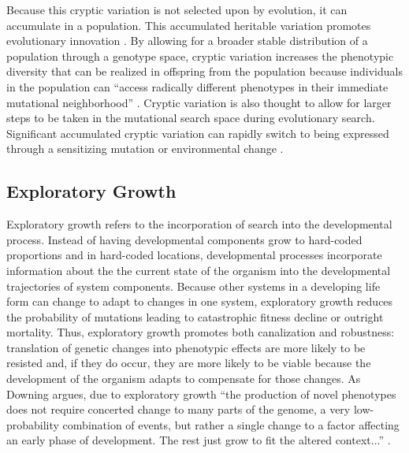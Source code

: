 Because this cryptic variation is not selected upon by evolution, it can accumulate in a population. This accumulated heritable variation promotes evolutionary innovation \cite{Wilder2015ReconcilingEvolvability}. By allowing for a broader stable distribution of a population through a genotype space, cryptic variation increases the phenotypic diversity that can be realized in offspring from the population because individuals in the population can ``access radically different phenotypes in their immediate mutational neighborhood'' \cite{Wilder2015ReconcilingEvolvability}. Cryptic variation is also thought to allow for larger steps to be taken in the mutational search space during evolutionary search. Significant accumulated cryptic variation can rapidly switch to being expressed through a sensitizing mutation or environmental change \cite{Moczek2011TheInnovation}.
        
\subsection{Exploratory Growth}
Exploratory growth refers to the incorporation of search into the developmental process. Instead of having developmental components grow to hard-coded proportions and in hard-coded locations, developmental processes incorporate information about the the current state of the organism into the developmental trajectories of system components. Because other systems in a developing life form can change to adapt to changes in one system, exploratory growth reduces the probability of mutations leading to catastrophic fitness decline or outright mortality. Thus, exploratory growth promotes both canalization and robustness: translation of genetic changes into phenotypic effects are more likely to be resisted and, if they do occur, they are more likely to be viable because the development of the organism adapts to compensate for those changes. As Downing argues, due to exploratory growth ``the production of novel phenotypes does not require concerted change to many parts of the genome, a very low-probability combination of events, but rather a single change to a factor affecting an early phase of development. The rest just grow to fit the altered context...'' \cite[p 214]{Downing2015IntelligenceSystems}.


